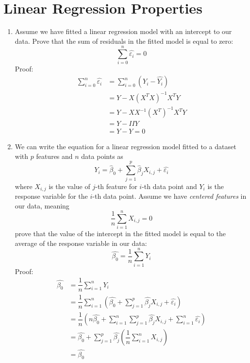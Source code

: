 \documentclass{article}
\begin{document}
\section{Linear Regression Properties}
\begin{enumerate}[label={(\alph*)}]
    \item Assume we have fitted a linear regression model with an intercept to our 
    data. Prove that the sum of residuals in the fitted model is equal to zero:
    \[
        \sum_{i=0}^n \hat{\varepsilon_i} = 0
    \]
    Proof:
    \begin{align*}
        \sum_{i=0}^n \hat{\varepsilon_i} &= 
        \sum_{i=0}^n (Y_i - \widehat{Y_i}) \\
        &= Y - X(X^TX)^{-1}X^TY \\
        &= Y - X X^{-1} (X^T)^{-1}  X^T Y \\
        &= Y - I I Y \\
        &= Y - Y = 0
    \end{align*}
    
    \item We can write the equation for a linear regression model fitted to a dataset 
    with $p$ features and $n$ data points as
    \[
        Y_i = \hat{\beta}_0 + \sum_{j=1}^p \hat{\beta}_j X_{i,j} + \hat{\varepsilon_i}
    \]
    where $X_{i,j}$ is the value of $j$-th feature for $i$-th data point and $Y_i$ is
    the response variable for the $i$-th data point. Assume we have 
    \emph{centered features} in our data, meaning
    \[
        \dfrac{1}{n} \sum_{i=1}^n X_{i,j} = 0
    \]
    prove that the value of the intercept in the fitted model is equal to the
    average of the response variable in our data:
    \[
        \hat{\beta_0} = \dfrac{1}{n} \sum_{i=1}^n Y_i
    \]
    Proof:
    \begin{align*}
        \hat{\beta_0} &= \dfrac{1}{n} \sum_{i=1}^n Y_i \\
        &= \dfrac{1}{n} \sum_{i=1}^n (\hat{\beta_0} + \sum_{j=1}^p \hat{\beta_j}
        X_{i,j} + \hat{\varepsilon_i}) \\
        &= \dfrac{1}{n} \left(n\hat{\beta_0} + \sum_{i=1}^n \sum_{j=1}^p \hat{\beta_j}
        X_{i,j} + \sum_{i=1}^n\hat{\varepsilon_i} \right) \\
        &= \hat{\beta_0} + \sum_{j=1}^p \hat{\beta_j} \left(\dfrac{1}{n}
        \sum_{i=1}^n X_{i,j}\right) \\
        &= \hat{\beta_0}
    \end{align*}
\end{enumerate}

%
%
\end{document}
